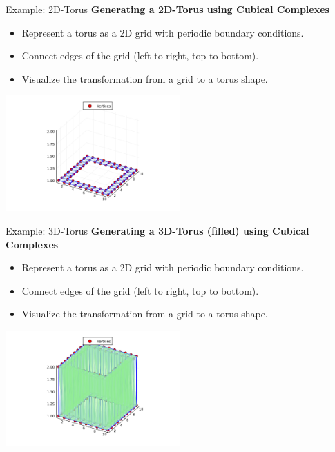 \documentclass[aspectratio=169,xcolor=dvipsnames]{beamer}
\begin{document}

\begin{frame}{Example: 2D-Torus}
    \textbf{Generating a 2D-Torus using Cubical Complexes}
    \begin{itemize}
        \item Represent a torus as a 2D grid with periodic boundary conditions.
        \item Connect edges of the grid (left to right, top to bottom).
        \item Visualize the transformation from a grid to a torus shape.
    \end{itemize}

    \vspace{1em}
    \centering
    \includegraphics[width=0.5\textwidth]{torus2D.png} %
\end{frame}


\begin{frame}{Example: 3D-Torus}
    \textbf{Generating a 3D-Torus (filled) using Cubical Complexes}
    \begin{itemize}
        \item Represent a torus as a 2D grid with periodic boundary conditions.
        \item Connect edges of the grid (left to right, top to bottom).
        \item Visualize the transformation from a grid to a torus shape.
    \end{itemize}

    \vspace{1em}
    \centering
    \includegraphics[width=0.5\textwidth]{torus3D.png} %
\end{frame}
\end{document}
